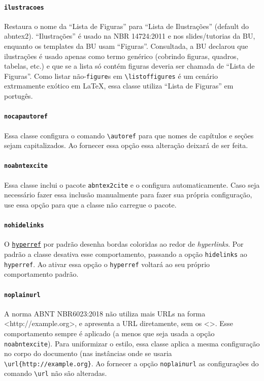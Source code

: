 \documentclass[embeddedlogo]{ufsc-thesis-rn46-2019}
\newcommand{\lacmd}[1]{\texttt{\textbackslash{}#1}}
\begin{document}
\paragraph*{\texttt{ilustracoes}} Restaura o nome da ``Lista de Figuras'' para
``Lista de Ilustrações'' (default do abntex2). ``Ilustrações'' é usado na NBR
14724:2011 e nos slides/tutorias da BU, enquanto os templates da BU usam
``Figuras''. Consultada, a BU declarou que ilustrações é usado apenas como termo
genérico (cobrindo figuras, quadros, tabelas, etc.) e que se a lista só contém
figuras deveria ser chamada de ``Lista de Figuras''. Como listar
não-\texttt{figure}s em \lacmd{listoffigures} é um cenário extrmamente exótico
em \LaTeX, essa classe utiliza ``Lista de Figuras'' em portugês.

\paragraph*{\texttt{nocapautoref}} Essa classe configura o comando
\lacmd{autoref} para que nomes de capítulos e seções sejam capitalizados. Ao
fornecer essa opção essa alteração deixará de ser feita.

\paragraph*{\texttt{noabntexcite}} Essa classe inclui o pacote
\texttt{abntex2cite} e o configura automaticamente. Caso seja necessário fazer
essa inclusão manualmente para fazer sua própria configuração, use essa opção
para que a classe não carregue o pacote.

\paragraph*{\texttt{nohidelinks}} O
\href{https://ctan.org/pkg/hyperref}{\texttt{hyperref}} por padrão desenha
bordas coloridas ao redor de \emph{hyperlinks}. Por padrão a classe desativa
esse comportamento, passando a opção \texttt{hidelinks} ao \texttt{hyperref}.
Ao ativar essa opção o \texttt{hyperref} voltará ao seu próprio comportamento
padrão.

\paragraph*{\texttt{noplainurl}} A norma ABNT NBR6023:2018 não utiliza mais URLs
na forma <http://example.org>, e apresenta a URL diretamente, sem os <>.  Esse
comportamento sempre é aplicado (a menos que seja usada a opção
\texttt{noabntexcite}). Para uniformizar o estilo, essa classe aplica a mesma
configuração no corpo do documento (nas instâncias onde se usaria
\lacmd{url\{http://example.org\}}. Ao fornecer a opção \texttt{noplainurl} as
configurações do comando \lacmd{url} não são alteradas.
\end{document}
